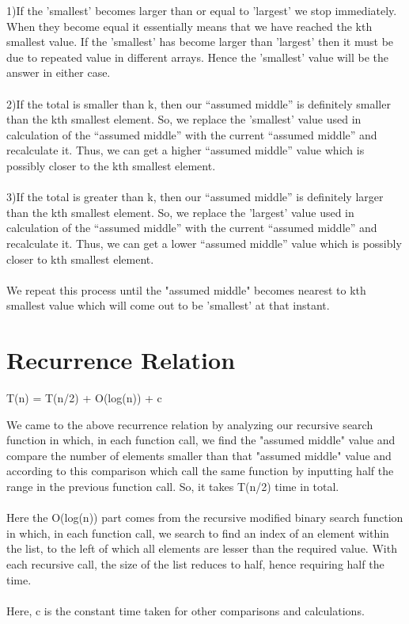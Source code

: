 \documentclass{article}
\begin{document}
1)If the 'smallest' becomes larger than or equal to 'largest' we stop immediately. When they become equal it essentially means that we have reached the kth smallest value. If the 'smallest' has become larger than 'largest' then it must be due to repeated value in different arrays. Hence the 'smallest' value will be the answer in either case.
\\\\
2)If the total is smaller than k, then our “assumed middle” is definitely smaller than the kth smallest element. So, we replace the 'smallest' value used in calculation of the “assumed middle” with the current “assumed middle” and recalculate it. Thus, we can get a higher “assumed middle” value which is possibly closer to the kth smallest element.
\\\\
3)If the total is greater than k, then our “assumed middle” is definitely larger than the kth smallest element. So, we replace the 'largest' value used in calculation of the “assumed middle” with the current “assumed middle” and recalculate it. Thus, we can get a lower “assumed middle” value which is possibly closer to kth smallest element.
\\\\
We repeat this process until the "assumed middle" becomes nearest to kth smallest value which will come out to be 'smallest' at that instant.


\section{Recurrence Relation}
\begin{center}
T(n) = T(n/2) + O(log(n)) + c
\end{center}
We came to the above recurrence relation by analyzing our recursive search function in which, in each function call, we find the "assumed middle" value and compare the number of elements smaller than that "assumed middle" value and according to this comparison which call the same function by inputting half the range in the previous function call. So, it takes T(n/2) time in total. 
\\\\Here the O(log(n)) part comes from the recursive modified binary search function in which, in each function call, we search to find an index of an element within the list, to the left of which all elements are lesser than the required value. With each recursive call, the size of the list reduces to half, hence requiring half the time.
\\\\Here, c is the constant time taken for other comparisons and calculations.
\end{document}
